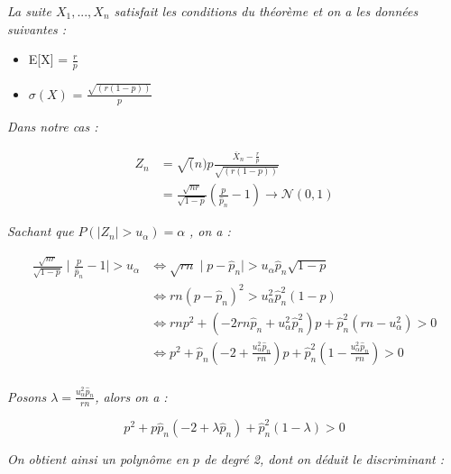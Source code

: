 \documentclass[a4paper,11pt]{article}
\theoremstyle{nonumberplain}
\theoremstyle{nonumberplain}
\theoremstyle{nonumberplain}
\begin{document}
    \begin{calculs}
        \emph{La suite $X_1, ..., X_n$ satisfait les conditions du théorème et on a les données suivantes :}
        \begin{itemize}
            \item E[X] = $\frac{r}{p}$
            \item $\sigma(X)$ = $\frac{\sqrt{(r (1 - p))}}{p}$
        \end{itemize}

        \emph{Dans notre cas :}

        \vspace{-2ex}
        \begin{equation*}
        \begin{split}
            Z_n & = \sqrt(n) p \frac{\overline{X}_n - \frac{r}{p}}{\sqrt{(r (1 - p))}} \\
                & = \frac{\sqrt{n r}}{\sqrt{1 - p}} (\frac{p}{\hat{p}_n} - 1) \rightarrow \mathcal{N}(0, 1)
        \end{split}
        \end{equation*}

        \emph{Sachant que } $ P(\mid Z_n \mid > u_\alpha) = \alpha$ \emph{, on a :}

        \begin{equation*}
        \begin{split}
            \frac{\sqrt{n r}}{\sqrt{1 - p}} \mid \frac{p}{\hat{p}_n} - 1 \mid > u_\alpha
            & \iff \sqrt{r n} \mid p - \hat{p}_n \mid > u_\alpha \hat{p}_n \sqrt{1 - p} \\
            & \iff r n (p - \hat{p}_n)^2 > u_\alpha^2 \hat{p}_n^2 (1 - p) \\
            & \iff r n p^2 + (-2 r n \hat{p}_n + u_\alpha^2 \hat{p}_n^2) p + \hat{p}_n^2 (rn - u_\alpha^2) > 0 \\
            & \iff p^2 + \hat{p}_n (-2 + \frac{u_\alpha^2 \hat{p}_n}{r n}) p + \hat{p}_n^2 (1 - \frac{u_\alpha^2 \hat{p}_n}{r n}) > 0\\
        \end{split}
        \end{equation*}

        \emph{Posons $\lambda = \frac{u_\alpha^2 \hat{p}_n}{r n}$, alors on a : }

        \[
            p^2 + p \hat{p}_n (-2 + \lambda \hat{p}_n) + \hat{p}_n^2 (1 - \lambda) > 0
        \]

        \emph{On obtient ainsi un polynôme en $p$ de degré 2, dont on déduit le discriminant :}


\end{calculs}
\end{document}
